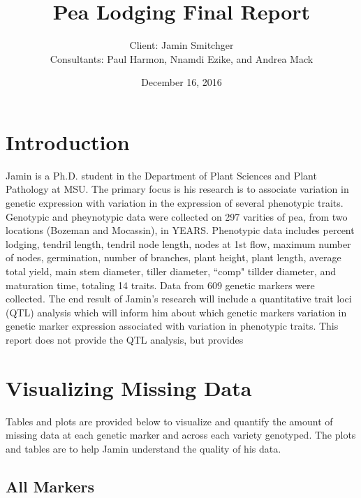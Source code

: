 \documentclass[11pt]{article}\usepackage[]{graphicx}\usepackage[]{color}
\title{Pea Lodging Final Report}
\author{Client: Jamin Smitchger\\
Consultants: Paul Harmon, Nnamdi Ezike, and Andrea Mack}
\date{December 16, 2016}
\begin{document}
\maketitle





\section{Introduction}
Jamin is a Ph.D. student in the Department of Plant Sciences and Plant Pathology at MSU. The primary focus is his research is to associate variation in genetic expression with variation in the expression of several phenotypic traits. Genotypic and pheynotypic data were collected on 297 varities of pea, from two locations (Bozeman and Mocassin), in YEARS. Phenotypic data includes percent lodging, tendril length, tendril node length, nodes at 1st flow, maximum number of nodes, germination, number of branches, plant height, plant length, average total yield, main stem diameter, tiller diameter, ``comp" tillder diameter, and maturation time, totaling 14 traits. Data from 609 genetic markers were collected. The end result of Jamin's research will include a quantitative trait loci (QTL) analysis which will inform him about which genetic markers variation in genetic marker expression associated with variation in phenotypic traits. This report does not provide the QTL analysis, but provides

\section{Visualizing Missing Data}
Tables and plots are provided below to visualize and quantify the amount of missing data at each genetic marker and across each variety genotyped. The plots and tables are to help Jamin understand the quality of his data.
\subsection{All Markers}
\end{document}
